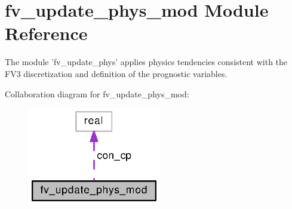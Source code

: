 \section{fv\-\_\-update\-\_\-phys\-\_\-mod Module Reference}
\label{classfv__update__phys__mod}


The module 'fv\-\_\-update\-\_\-phys' applies physics tendencies consistent with the F\-V3 discretization and definition of the prognostic variables.  




Collaboration diagram for fv\-\_\-update\-\_\-phys\-\_\-mod\-:
\nopagebreak
\begin{figure}[H]
\begin{center}
\leavevmode
\includegraphics[width=164pt]{classfv__update__phys__mod__coll__graph}
\end{center}
\end{figure}
